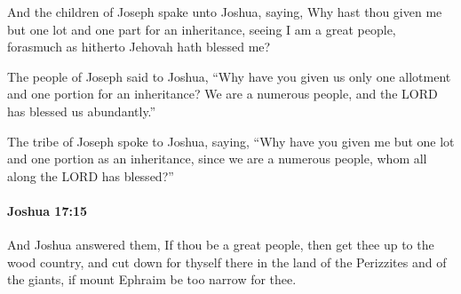 			\begin{versebox}
					\item[BHS] 
					\item[ASV] And the children of Joseph spake unto Joshua, saying, Why hast thou given me but one lot and one part for an inheritance, seeing I am a great people, forasmuch as hitherto Jehovah hath blessed me?
					\item[NIV] The people of Joseph said to Joshua, “Why have you given us only one allotment and one portion for an inheritance? We are a numerous people, and the LORD has blessed us abundantly.”
					\item[NRSV] The tribe of Joseph spoke to Joshua, saying, “Why have you given me but one lot and one portion as an inheritance, since we are a numerous people, whom all along the LORD has blessed?”
			\end{versebox}

		\paragraph{Joshua 17:15} %
			\label{JOSHUA-17-15}

			And Joshua answered them, If thou be a great people, then get thee up to the wood country, and cut down for thyself there in the land of the Perizzites and of the giants, if mount Ephraim be too narrow for thee.

